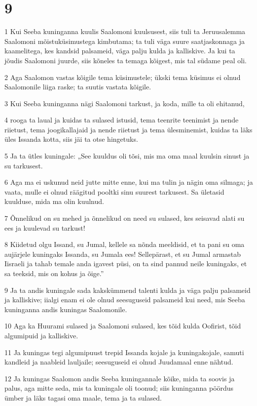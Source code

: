 \chapter{9}

\par 1 Kui Seeba kuninganna kuulis Saalomoni kuulsusest, siis tuli ta Jeruusalemma Saalomoni mõistuküsimustega kimbutama; ta tuli väga suure saatjaskonnaga ja kaamelitega, kes kandsid palsameid, väga palju kulda ja kalliskive. Ja kui ta jõudis Saalomoni juurde, siis kõneles ta temaga kõigest, mis tal südame peal oli.
\par 2 Aga Saalomon vastas kõigile tema küsimustele; ükski tema küsimus ei olnud Saalomonile liiga raske; ta suutis vastata kõigile.
\par 3 Kui Seeba kuninganna nägi Saalomoni tarkust, ja koda, mille ta oli ehitanud,
\par 4 rooga ta laual ja kuidas ta sulased istusid, tema teenrite teenimist ja nende riietust, tema joogikallajaid ja nende riietust ja tema ülesminemist, kuidas ta läks üles Issanda kotta, siis jäi ta otse hingetuks.
\par 5 Ja ta ütles kuningale: „See kuuldus oli tõsi, mis ma oma maal kuulsin sinust ja su tarkusest.
\par 6 Aga ma ei uskunud neid jutte mitte enne, kui ma tulin ja nägin oma silmaga; ja vaata, mulle ei olnud räägitud pooltki sinu suurest tarkusest. Sa ületasid kuulduse, mida ma olin kuulnud.
\par 7 Õnnelikud on su mehed ja õnnelikud on need su sulased, kes seisavad alati su ees ja kuulevad su tarkust!
\par 8 Kiidetud olgu Issand, su Jumal, kellele sa nõnda meeldisid, et ta pani su oma aujärjele kuningaks Issanda, su Jumala ees! Sellepärast, et su Jumal armastab Iisraeli ja tahab temale anda igavest püsi, on ta sind pannud neile kuningaks, et sa teeksid, mis on kohus ja õige.”
\par 9 Ja ta andis kuningale sada kakskümmend talenti kulda ja väga palju palsameid ja kalliskive; iialgi enam ei ole olnud seesuguseid palsameid kui need, mis Seeba kuninganna andis kuningas Saalomonile.
\par 10 Aga ka Huurami sulased ja Saalomoni sulased, kes tõid kulda Oofirist, tõid algumipuid ja kalliskive.
\par 11 Ja kuningas tegi algumipuust trepid Issanda kojale ja kuningakojale, samuti kandleid ja naableid lauljaile; seesuguseid ei olnud Juudamaal enne nähtud.
\par 12 Ja kuningas Saalomon andis Seeba kuningannale kõike, mida ta soovis ja palus, aga mitte seda, mis ta kuningale oli toonud; siis kuninganna pöördus ümber ja läks tagasi oma maale, tema ja ta sulased.

